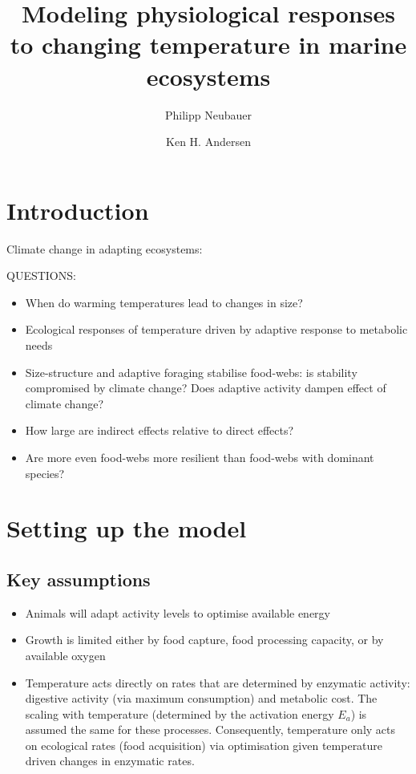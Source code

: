 \documentclass{article}\usepackage[]{graphicx}\usepackage[]{color}
\title{Modeling physiological responses to changing temperature in marine ecosystems}
\author{Philipp Neubauer \and Ken H. Andersen}
\begin{document}
\maketitle

\section{Introduction}

Climate change in adapting ecosystems: 


QUESTIONS:
\begin{itemize}
\item When do warming temperatures lead to changes in size?
\item Ecological responses of temperature driven by adaptive response to metabolic needs
\item Size-structure and adaptive foraging stabilise food-webs: is stability compromised by climate change? Does adaptive activity dampen effect of climate change?
\item How large are indirect effects relative to direct effects?
\item Are more even food-webs more resilient than food-webs with dominant species?
\end{itemize}

\section{Setting up the model}

\subsection{Key assumptions}
\begin{itemize}
\item Animals will adapt activity levels to optimise available energy
\item Growth is limited either by food capture, food processing capacity, or by available oxygen
\item Temperature acts directly on rates that are determined by enzymatic activity: digestive activity (via maximum consumption) and metabolic cost. The scaling with temperature (determined by the activation energy $E_a$) is assumed the same for these processes. Consequently, temperature only acts on ecological rates (food acquisition) via optimisation given temperature driven changes in enzymatic rates.


\end{itemize}
\end{document}
